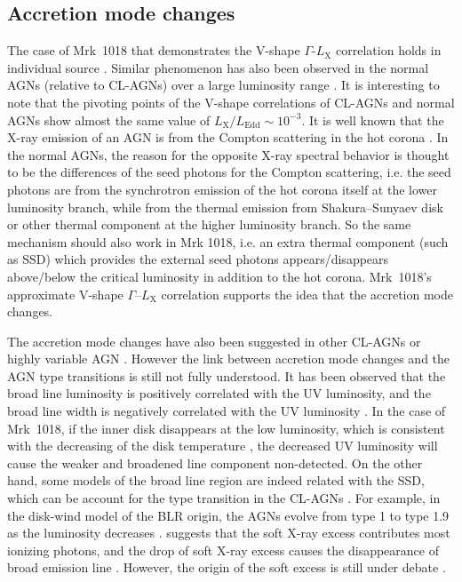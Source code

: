 \documentclass[twocolumn]{aastex63}
\begin{document}
\subsection{Accretion mode changes}
\label{sec:spectral evolution}

 The case of Mrk~1018 that demonstrates the V-shape $\Gamma$-$L_\mathrm{X}$ correlation holds in individual source \citep[see also in ][etc]{2020ApJ...890L..29A}. Similar phenomenon has also been observed in the normal AGNs (relative to CL-AGNs) over a large luminosity range \citep[e.g. ][]{2009MNRAS.399..349G, 2011A&A...530A.149Y}. It is interesting to note that the pivoting points of the V-shape correlations of CL-AGNs and normal AGNs show almost the same value of $L_\mathrm{X}/L_\mathrm{Edd}\sim 10^{-3}$. It is well known that the X-ray emission of an AGN is from the Compton scattering in the hot corona \citep[e.g.][]{1991ApJ...380L..51H}. In the normal AGNs, the reason for the opposite X-ray spectral behavior is thought to be the differences of the seed photons for the Compton scattering, i.e. the seed photons are from the synchrotron emission of the hot corona itself at the lower luminosity branch, while from the thermal emission from Shakura–Sunyaev disk \citep[SSD; e.g. ][]{2013ApJ...764....2Q} or other thermal component \citep{2015MNRAS.447.1692Y} at the higher luminosity branch. So the same mechanism should also work in Mrk 1018, i.e. an extra thermal component (such as SSD) which provides the external seed photons appears/disappears above/below the critical luminosity in addition to the hot corona. Mrk~1018's approximate V-shape $\Gamma$--$L_\mathrm{X}$ correlation supports the idea that the accretion mode changes. 
 

 
 The accretion mode changes have also been suggested in other CL-AGNs or highly variable AGN \citep{2019arXiv191203972L,2020ApJ...890L..29A,2020MNRAS.492.2335L}. However the link between accretion mode changes and the AGN type transitions is still not fully understood. It has been observed that the broad line luminosity is positively correlated with the UV luminosity, and the broad line width is negatively correlated with the UV luminosity \citep[e.g.][]{2019ApJ...885...44D}. In the case of Mrk~1018, if the inner disk disappears at the low luminosity, which is consistent with the decreasing of the disk temperature \citep[see also ][]{2018MNRAS.480.3898N}, the decreased UV luminosity will cause the weaker and broadened line component non-detected. On the other hand, some models of the broad line region are indeed related with the SSD, which can be account for the type transition in the CL-AGNs \citep[see a recent review in ][and references therein]{2019OAst...28..200C}. For example, in the disk-wind model of the BLR origin, the AGNs evolve from type 1 to type 1.9 as the luminosity decreases \citep[see][]{2014MNRAS.438.3340E}. \citet{2018MNRAS.480.3898N} suggests that the soft X-ray excess contributes most ionizing photons, and the drop of soft X-ray excess causes the disappearance of broad emission line \citep[see also in ][]{2020MNRAS.492.2335L}. However, the origin of the soft excess is still under debate \citep[e.g.][]{2018A&A...611A..59P}. 
\end{document}
